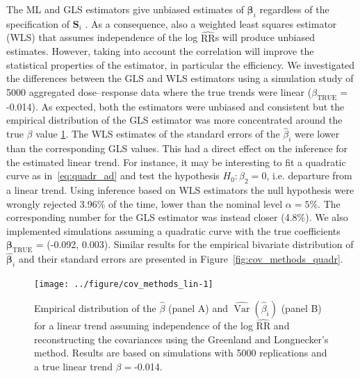 \documentclass[11pt,a4paper,twoside,openany]{book}\usepackage{knitr}
\DeclareMathOperator{\Var}{Var}
\begin{document}
{The ML and GLS estimators give unbiased estimates of $\boldsymbol{\beta}_i$ regardless of the specification of $\mathbf{S}_i$ \citep{orsini2006generalized}. As a consequence, also a weighted least squares estimator (WLS) that assumes independence of the log $\widehat{\mathrm{RR}}$s will produce unbiased estimates. However, taking into account the correlation will improve the statistical properties of the estimator, in particular the efficiency. 
We investigated the differences between the GLS and WLS estimators using a simulation study of 5000 aggregated dose--response data where the true trends were linear ($\beta_\text{TRUE} =$ -0.014). As expected, both the estimators were unbiased and consistent but the empirical distribution of the GLS estimator was more concentrated around the true $\beta$ value \ref{fig:cov_methods_lin}. The WLS estimates of the standard errors of the $\hat \beta_i$ were lower than the corresponding GLS values. This had a direct effect on the inference for the estimated linear trend. For instance, it may be interesting to fit a quadratic curve as in~\ref{eq:quadr_ad} and test the hypothesis $H_0: \beta_2 = 0$, i.e. departure from a linear trend. Using inference based on WLS estimators the null hypothesis were wrongly rejected 3.96\% of the time, lower than the nominal level $\alpha = 5$\%. The corresponding number for the GLS estimator was instead closer (4.8\%). 
\noindent We also implemented simulations assuming a quadratic curve with the true coefficients $\boldsymbol{\beta}_\text{TRUE}$ = (-0.092, 0.003). Similar results for the empirical bivariate distribution of $ \boldsymbol{\hat \beta}_i$ and their standard errors are presented in Figure~\ref{fig:cov_methods_quadr}.

\begin{knitrout}\footnotesize
{}\color{fgcolor}\begin{figure}[ht!]

{\centering \texttt{[image: ../figure/cov\_methods\_lin-1]} 

}

\caption[Empirical distribution of the $\hat \beta$ (panel A) and $\widehat{\Var} \left( \hat \beta_i \right)$ (panel B) for a linear trend assuming independence of the log $\widehat{\mathrm{RR}}$  and reconstructing the covariances using the Greenland and Longnecker’s method]{Empirical distribution of the $\hat \beta$ (panel A) and $\widehat{\Var} \left( \hat \beta_i \right)$ (panel B) for a linear trend assuming independence of the log $\widehat{\mathrm{RR}}$  and reconstructing the covariances using the Greenland and Longnecker’s method. Results are based on simulations with 5000 replications and a true linear trend $\beta = $-0.014.}\label{fig:cov_methods_lin}
\end{figure}



\end{knitrout}}
\end{document}
